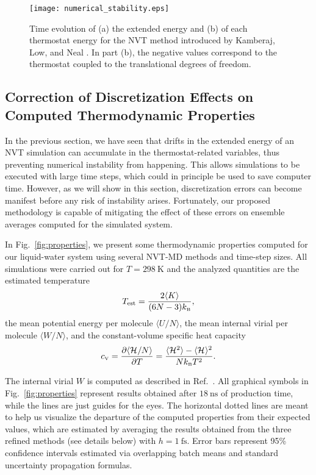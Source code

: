 \documentclass[
	aip,
	jcp,
	reprint,
]{revtex4-1}
\newcommand{\Ham}[1]{{\mathcal H}_\text{#1}}           %
\newcommand{\timestep}{h}
\newcommand{\mini}[1]{\text{\tiny{#1}}}
\begin{document}
\begin{figure}
	\texttt{[image: numerical\_stability.eps]}
	\caption{Time evolution of (a) the extended energy and (b) of each thermostat energy for the NVT method introduced by Kamberaj, Low, and Neal \cite{Kamberaj_2005}. In part (b), the negative values correspond to the thermostat coupled to the translational degrees of freedom.}
	\label{fig:num_stab}
\end{figure}

\subsection{Correction of Discretization Effects on Computed Thermodynamic Properties}
\label{sec:discretization effects}

In the previous section, we have seen that drifts in the extended energy of an NVT simulation can accumulate in the thermostat-related variables, thus preventing numerical instability from happening.
This allows simulations to be executed with large time steps, which could in principle be used to save computer time.
However, as we will show in this section, discretization errors can become manifest before any risk of instability arises.
Fortunately, our proposed methodology is capable of mitigating the effect of these errors on ensemble averages computed for the simulated system.

In Fig.~\ref{fig:properties}, we present some thermodynamic properties computed for our liquid-water system using several NVT-MD methods and time-step sizes.
All simulations were carried out for $T = 298~\text{K}$ and the analyzed quantities are the estimated temperature
\begin{equation*}
T_\text{est} = \frac{2\langle K \rangle}{(6N-3)k_\mini{B}},
\end{equation*}
the mean potential energy per molecule $\langle U/N \rangle$,
the mean internal virial per molecule $\langle W/N \rangle$, and
the constant-volume specific heat capacity
\begin{equation*}
c_\mini{V} = \frac{\partial \langle \Ham{}/N \rangle}{\partial T} = \frac{\langle \Ham{}^2 \rangle - \langle \Ham{} \rangle^2}{N k_\mini{B} T^2}.
\end{equation*}

The internal virial $W$ is computed as described in Ref.~.
All graphical symbols in Fig.~\ref{fig:properties} represent results obtained after $18~\text{ns}$ of production time, while the lines are just guides for the eyes.
The horizontal dotted lines are meant to help us visualize the departure of the computed properties from their expected values, which are estimated by averaging the results obtained from the three refined methods (see details below) with $\timestep = 1~\text{fs}$.
Error bars represent 95\% confidence intervals estimated via overlapping batch means \cite{Meketon_1984, Flegal_2010} and standard uncertainty propagation formulas.
\end{document}
